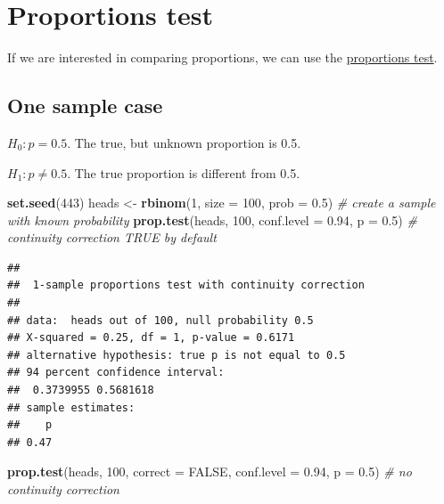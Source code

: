 \documentclass[
]{book}
\newenvironment{Shaded}{\begin{snugshade}}{\end{snugshade}}
\newcommand{\AttributeTok}[1]{\textcolor[rgb]{0.13,0.29,0.53}{#1}}
\newcommand{\CommentTok}[1]{\textcolor[rgb]{0.56,0.35,0.01}{\textit{#1}}}
\newcommand{\ConstantTok}[1]{\textcolor[rgb]{0.56,0.35,0.01}{#1}}
\newcommand{\DecValTok}[1]{\textcolor[rgb]{0.00,0.00,0.81}{#1}}
\newcommand{\FloatTok}[1]{\textcolor[rgb]{0.00,0.00,0.81}{#1}}
\newcommand{\FunctionTok}[1]{\textcolor[rgb]{0.13,0.29,0.53}{\textbf{#1}}}
\newcommand{\NormalTok}[1]{#1}
\newcommand{\OtherTok}[1]{\textcolor[rgb]{0.56,0.35,0.01}{#1}}
\begin{document}
\section{Proportions test}\label{proportions-test}

If we are interested in comparing proportions,
we can use the \href{https://www.rdocumentation.org/packages/stats/versions/3.6.2/topics/prop.test}{proportions test}.

\subsection{One sample case}\label{one-sample-case}

\(H_0: p = 0.5\). The true, but unknown proportion is 0.5.

\(H_1: p \ne 0.5\). The true proportion is different from 0.5.

\begin{Shaded}
\begin{Highlighting}[]
\FunctionTok{set.seed}\NormalTok{(}\DecValTok{443}\NormalTok{)}
\NormalTok{heads }\OtherTok{\textless{}{-}} \FunctionTok{rbinom}\NormalTok{(}\DecValTok{1}\NormalTok{, }\AttributeTok{size =} \DecValTok{100}\NormalTok{,}
                \AttributeTok{prob =} \FloatTok{0.5}\NormalTok{) }\CommentTok{\# create a sample with known probability}
\FunctionTok{prop.test}\NormalTok{(heads, }\DecValTok{100}\NormalTok{,}
          \AttributeTok{conf.level =} \FloatTok{0.94}\NormalTok{, }\AttributeTok{p =} \FloatTok{0.5}\NormalTok{) }\CommentTok{\# continuity correction TRUE by default}
\end{Highlighting}
\end{Shaded}

\begin{verbatim}
## 
##  1-sample proportions test with continuity correction
## 
## data:  heads out of 100, null probability 0.5
## X-squared = 0.25, df = 1, p-value = 0.6171
## alternative hypothesis: true p is not equal to 0.5
## 94 percent confidence interval:
##  0.3739955 0.5681618
## sample estimates:
##    p 
## 0.47
\end{verbatim}

\begin{Shaded}
\begin{Highlighting}[]
\FunctionTok{prop.test}\NormalTok{(heads, }\DecValTok{100}\NormalTok{,}
          \AttributeTok{correct =} \ConstantTok{FALSE}\NormalTok{,}
          \AttributeTok{conf.level =} \FloatTok{0.94}\NormalTok{, }\AttributeTok{p =} \FloatTok{0.5}\NormalTok{) }\CommentTok{\# no continuity correction}
\end{Highlighting}
\end{Shaded}
\end{document}
